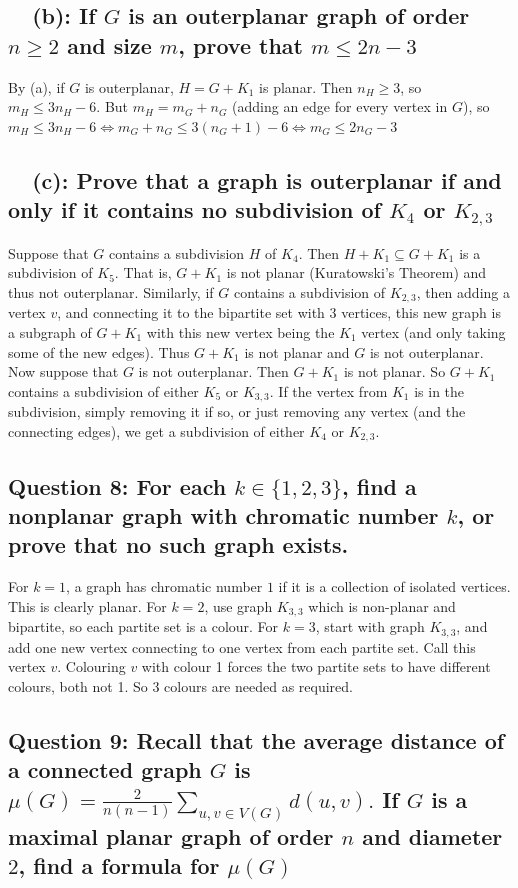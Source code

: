 \documentclass[letterpaper, 11pt]{article}
\newcommand{\1}{\mathds{1}}	%
\theoremstyle{definition}
\begin{document}
\subsection*{\ \ (b): If $G$ is an outerplanar graph of order $n \ge 2$ and size $m$, prove that $m \le 2n - 3$}
By (a), if $G$ is outerplanar, $H = G + K_1$ is planar. Then $n_H \ge 3$, so $m_H \le 3n_H - 6$. But $m_H = m_G + n_G$ (adding an edge for every vertex in $G$), so $m_H \le 3n_H - 6 \iff m_G + n_G \le 3 (n_G + 1) - 6 \iff m_G \le 2n_G - 3$
\subsection*{\ \ (c): Prove that a graph is outerplanar if and only if it contains no subdivision of $K_4$ or $K_{2,3}$}
Suppose that $G$ contains a subdivision $H$ of $K_4$. Then $H + K_1 \subseteq G + K_1$ is a subdivision of $K_5$. That is, $G + K_1$ is not planar (Kuratowski's Theorem) and thus not outerplanar. Similarly, if $G$ contains a subdivision of $K_{2,3}$, then adding a vertex $v$, and connecting it to the bipartite set with 3 vertices, this new graph is a subgraph of $G + K_1$ with this new vertex being the $K_1$ vertex (and only taking some of the new edges). Thus $G + K_1$ is not planar and $G$ is not outerplanar. Now suppose that $G$ is not outerplanar. Then $G + K_1$ is not planar. So $G + K_1$ contains a subdivision of either $K_5$ or $K_{3,3}$. If the vertex from $K_1$ is in the subdivision, simply removing it if so, or just removing any vertex (and the connecting edges), we get a subdivision of either $K_4$ or $K_{2,3}$.

\subsection*{Question 8: For each $k \in \{1,2,3\}$, find a nonplanar graph with chromatic number $k$, or prove
that no such graph exists.}
For $k = 1$, a graph has chromatic number $1$ if it is a collection of isolated vertices. This is clearly planar. For $k = 2$, use graph $K_{3,3}$ which is non-planar and bipartite, so each partite set is a colour. For $k = 3$, start with graph $K_{3,3}$, and add one new vertex connecting to one vertex from each partite set. Call this vertex $v$. Colouring $v$ with colour 1 forces the two partite sets to have different colours, both not 1. So 3 colours are needed as required.

\subsection*{Question 9: Recall that the average distance of a connected graph $G$ is $\mu (G) = \frac{2}{n(n-1)} \sum \limits _{u,v \in V(G)} d(u,v).$ If $G$ is a maximal planar graph of order $n$ and diameter $2$, find a formula for $\mu (G)$}
\end{document}
